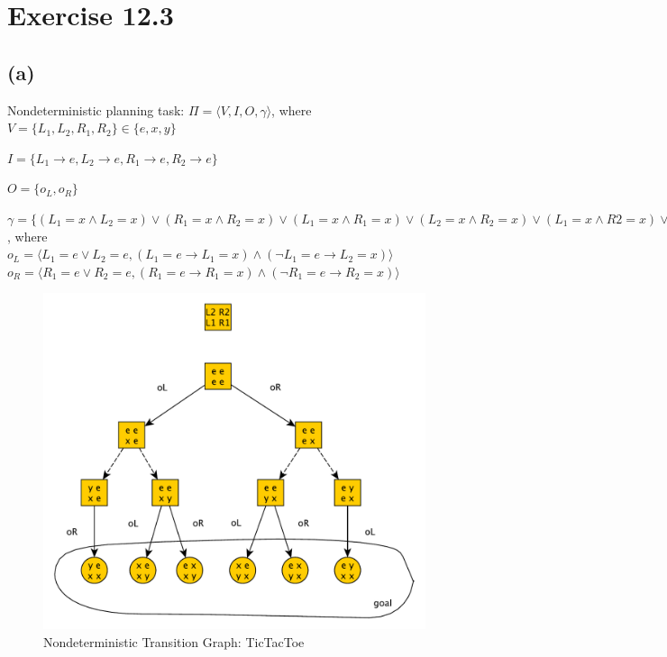 \documentclass[11pt,a4paper]{article}
\begin{document}
\section*{Exercise 12.3}
\subsection*{(a)}
Nondeterministic planning task: $\Pi = \langle V, I, O, \gamma\rangle$, where\\

$V = \{L_1, L_2, R_1, R_2\} \in \{e, x, y\}$

$I = \{L_1 \to e, L_2 \to e, R_1 \to e, R_2 \to e\}$

$O = \{o_L, o_R\}$

$\gamma = \{(L_1=x \land L_2=x) \lor (R_1=x \land R_2=x) \lor (L_1=x \land R_1=x) \lor (L_2=x \land R_2=x) \lor (L_1=x \land R2=x) \lor (L_2=x \land R_1=x)   \}$, where \\

$o_L = \langle L_1=e \lor L_2=e, (L_1=e \to L_1=x) \land (\lnot L_1=e \to L_2=x)\rangle$ \\
$o_R = \langle R_1=e \lor R_2=e, (R_1=e \to R_1=x) \land (\lnot R_1=e \to R_2=x)\rangle$

\begin{figure}[h!]
\includegraphics[scale=0.5]{NondeterministicTicTacToe}
\caption{Nondeterministic Transition Graph: TicTacToe}
\end{figure}



\label{lastpage}
\end{document}
